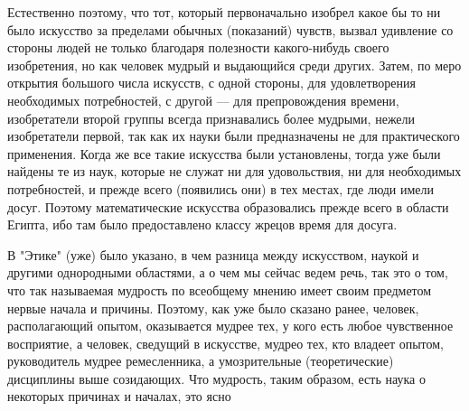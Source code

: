 \documentclass{article}
\begin{document}
Естественно поэтому, что тот, который первоначально изобрел какое бы то ни было искусство за пределами обычных (показаний) чувств, вызвал удивление со стороны людей не только благодаря полезности какого-нибудь своего изобретения, но как человек мудрый и выдающийся среди других. Затем, по меро открытия большого числа искусств, с одной стороны, для удовлетворения необходимых потребностей, с другой — для препровождения времени, изобретатели второй группы всегда признавались более мудрыми, нежели изобретатели первой, так как их науки были предназначены не для практического применения. Когда же все такие искусства были установлены, тогда уже были найдены те из наук, которые не служат ни для удовольствия, ни для необходимых потребностей, и прежде всего (появились они) в тех местах, где люди имели досуг. Поэтому математические искусства образовались прежде всего в области Египта, ибо там было предоставлено классу жрецов время для досуга.

В "Этике" (уже) было указано, в чем разница между искусством, наукой и другими однородными областями,
\footnotemark[7]
а о чем мы сейчас ведем речь, так это о том, что так называемая мудрость по всеобщему мнению имеет своим предметом нервые начала и причины. Поэтому, как уже было сказано ранее, человек, располагающий опытом, оказывается мудрее тех, у кого есть любое чувственное восприятие, а человек, сведущий в искусстве, мудрео тех, кто владеет опытом, руководитель мудрее ремесленника, а умозрительные (теоретические) дисциплины выше созидающих. Что мудрость, таким образом, есть наука о некоторых причинах и началах, это ясно
\end{document}
